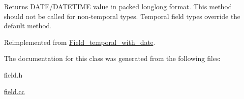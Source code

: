 Returns D\+A\+T\+E/\+D\+A\+T\+E\+T\+I\+ME value in packed longlong format. This method should not be called for non-\/temporal types. Temporal field types override the default method. 

Reimplemented from \mbox{\hyperlink{classField__temporal__with__date_a3d1a5e9fb109d1da223753c6072436ab}{Field\+\_\+temporal\+\_\+with\+\_\+date}}.



The documentation for this class was generated from the following files\+:\begin{DoxyCompactItemize}
\item 
field.\+h\item 
\mbox{\hyperlink{field_8cc}{field.\+cc}}\end{DoxyCompactItemize}
